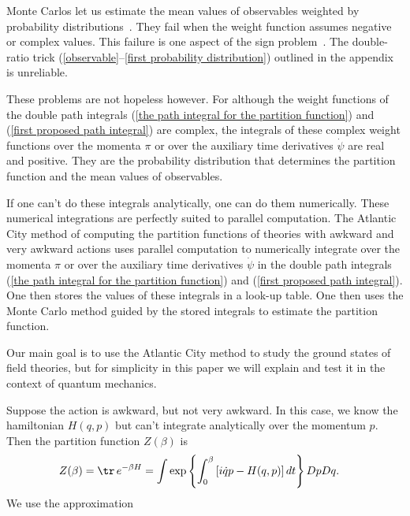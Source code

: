 \documentclass[prd,preprint,floatfix,showpacs]{revtex4-1}
\begin{document}
Monte Carlos let us estimate the mean values
of observables weighted by probability 
distributions~\cite{CahillXIV}.
They fail when the weight function assumes
negative or complex values.
This failure is one aspect of the sign 
problem~\cite{Behtash:2015loa, *Scorzato:2015qts, *Gattringer:2016kco}\@.
The double-ratio 
trick (\ref{observable}--\ref{first probability distribution})
outlined in the appendix is unreliable.
\par
These problems are not hopeless however.
For although the weight functions 
of the double path integrals
(\ref{the path integral for the partition function}) and 
(\ref {first proposed path integral})
are complex,
the integrals of these 
complex weight functions over 
the momenta \( \pi \) or over 
the auxiliary time derivatives \( \dot \psi \)
are real and positive.
They are the probability distribution
that determines the partition function
and the mean values of observables.
\par
If one can't do these
integrals analytically,
one can do them numerically.
These numerical integrations
are perfectly suited to parallel computation.
The Atlantic City method of computing
the partition functions of theories
with awkward and very awkward actions
uses parallel computation
to numerically integrate over 
the momenta \( \pi \) or over 
the auxiliary time derivatives \( \dot \psi \)
in the double path integrals
(\ref{the path integral for the partition function}) and 
(\ref {first proposed path integral})\@.
One then stores the values
of these integrals in a look-up table.
One then uses the Monte Carlo
method guided by the
stored integrals 
to estimate the partition function.
\par
Our main goal is
to use the Atlantic City method
to study the ground states
of field theories, but 
for simplicity in this paper
we will explain and test it in the context 
of quantum mechanics.
\par
Suppose the action is awkward,
but not very awkward.  
In this case, we know the hamiltonian
\( H(q,p) \) but can't integrate analytically
over the momentum \( p \)\@.
Then the partition function \( Z(\beta) \) is
\begin{equation} 
   \begin{split}
 Z(\beta) ={}& \tr \, e^{-\beta H} 
=  \int \exp\left\{ \int_0^\beta \left[ i \dot q p - H(q,p) \right] dt \right\}
Dp Dq .
 \label {The partition function then is}
    \end{split}
\end{equation}
We use the approximation
\end{document}
